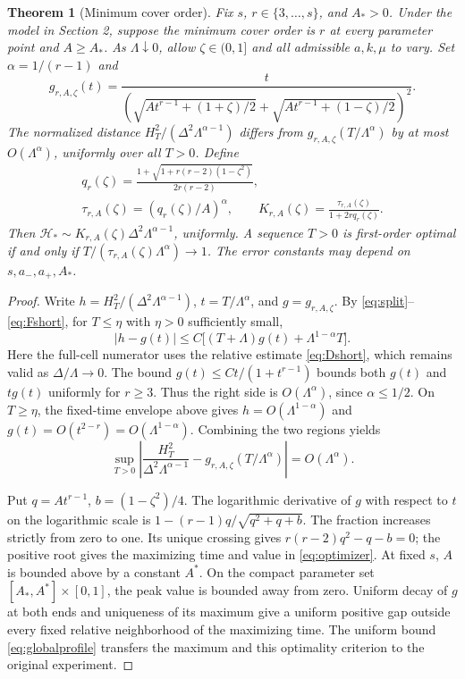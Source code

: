 \documentclass[11pt]{article}
\newtheorem{theorem}{Theorem}
\begin{document}
\begin{theorem}[Minimum cover order]\label{thm:cover}
Fix \(s\), \(r\in\{3,\ldots,s\}\), and \(A_*>0\). Under the model in Section 2, suppose the minimum cover order is \(r\) at every parameter point and \(A\ge A_*\). As \(\Lambda\downarrow0\), allow \(\zeta\in(0,1]\) and all admissible \(a,k,\mu\) to vary. Set \(\alpha=1/(r-1)\) and
\[
g_{r,A,\zeta}(t)=
\frac{t}{\left(\sqrt{At^{r-1}+(1+\zeta)/2}
+\sqrt{At^{r-1}+(1-\zeta)/2}\right)^2}.
\tag{7}\label{eq:profile}
\]
The normalized distance \(H_T^2/(\Delta^2\Lambda^{\alpha-1})\) differs from \(g_{r,A,\zeta}(T/\Lambda^\alpha)\) by at most \(O(\Lambda^\alpha)\), uniformly over all \(T>0\). Define
\[
\begin{gathered}
q_r(\zeta)=\frac{1+\sqrt{1+r(r-2)(1-\zeta^2)}}{2r(r-2)},\\
\tau_{r,A}(\zeta)=(q_r(\zeta)/A)^\alpha,\qquad
K_{r,A}(\zeta)=\frac{\tau_{r,A}(\zeta)}{1+2r q_r(\zeta)}.
\end{gathered}
\tag{8}\label{eq:optimizer}
\]
Then \(\mathcal H_*\sim K_{r,A}(\zeta)\Delta^2\Lambda^{\alpha-1}\), uniformly. A sequence \(T>0\) is first-order optimal if and only if \(T/(\tau_{r,A}(\zeta)\Lambda^\alpha)\to1\). The error constants may depend on \(s,a_-,a_+,A_*\).
\end{theorem}

\begin{proof}
Write \(h=H_T^2/(\Delta^2\Lambda^{\alpha-1})\), \(t=T/\Lambda^\alpha\), and \(g=g_{r,A,\zeta}\). By \eqref{eq:split}--\eqref{eq:Fshort}, for \(T\le\eta\) with \(\eta>0\) sufficiently small,
\[
|h-g(t)|\le C\bigl[(T+\Lambda)g(t)+\Lambda^{1-\alpha}T\bigr].
\]
Here the full-cell numerator uses the relative estimate \eqref{eq:Dshort}, which remains valid as \(\Delta/\Lambda\to0\). The bound \(g(t)\le C t/(1+t^{r-1})\) bounds both \(g(t)\) and \(t g(t)\) uniformly for \(r\ge3\). Thus the right side is \(O(\Lambda^\alpha)\), since \(\alpha\le1/2\). On \(T\ge\eta\), the fixed-time envelope above gives \(h=O(\Lambda^{1-\alpha})\) and \(g(t)=O(t^{2-r})=O(\Lambda^{1-\alpha})\). Combining the two regions yields
\[
\sup_{T>0}\left|\frac{H_T^2}{\Delta^2\Lambda^{\alpha-1}}
 -g_{r,A,\zeta}(T/\Lambda^\alpha)\right|=O(\Lambda^\alpha).
\tag{9}\label{eq:globalprofile}
\]

Put \(q=At^{r-1}\), \(b=(1-\zeta^2)/4\). The logarithmic derivative of \(g\) with respect to \(t\) on the logarithmic scale is \(1-(r-1)q/\sqrt{q^2+q+b}\). The fraction increases strictly from zero to one. Its unique crossing gives \(r(r-2)q^2-q-b=0\); the positive root gives the maximizing time and value in \eqref{eq:optimizer}. At fixed \(s\), \(A\) is bounded above by a constant \(A^*\). On the compact parameter set \([A_*,A^*]\times[0,1]\), the peak value is bounded away from zero. Uniform decay of \(g\) at both ends and uniqueness of its maximum give a uniform positive gap outside every fixed relative neighborhood of the maximizing time. The uniform bound \eqref{eq:globalprofile} transfers the maximum and this optimality criterion to the original experiment.
\end{proof}
\end{document}
